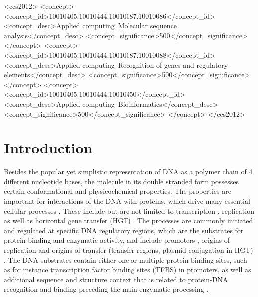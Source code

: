 \documentclass[sigconf]{acmart}
\begin{document}
\begin{CCSXML}
<ccs2012>
<concept>
<concept_id>10010405.10010444.10010087.10010086</concept_id>
<concept_desc>Applied computing~Molecular sequence analysis</concept_desc>
<concept_significance>500</concept_significance>
</concept>
<concept>
<concept_id>10010405.10010444.10010087.10010088</concept_id>
<concept_desc>Applied computing~Recognition of genes and regulatory elements</concept_desc>
<concept_significance>500</concept_significance>
</concept>
<concept>
<concept_id>10010405.10010444.10010450</concept_id>
<concept_desc>Applied computing~Bioinformatics</concept_desc>
<concept_significance>500</concept_significance>
</concept>
</ccs2012>
\end{CCSXML}



\maketitle


\section{Introduction}
Besides the popular yet simplistic representation of DNA as a polymer chain of 4 different nucleotide bases, the molecule in its double stranded form possesses certain conformational and physicochemical properties. The properties are important for interactions of the DNA with proteins, which drive many essential cellular processes \cite{Rohs2009-hm,Zrimec2015-xf,Zrimec2018-lx,Watson2008-dt}. These include but are not limited to transcription \cite{Rohs2009-hm}, replication \cite{Chen2012-gd} as well as horizontal gene transfer (HGT) \cite{Zrimec2018-lx,Zrimec2020-wx}. The processes are commonly initiated and regulated at specific DNA regulatory regions, which are the substrates for protein binding and enzymatic activity, and include promoters \cite{Watson2008-dt}, origins of replication \cite{Chen2012-gd} and origins of transfer (transfer regions, plasmid conjugation in HGT) \cite{Garcillan-Barcia2009-yk}. The DNA substrates contain either one or multiple protein binding sites, such as for instance transcription factor binding sites (TFBS) in promoters, as well as additional sequence and structure context that is related to protein-DNA recognition and binding preceding the main enzymatic processing \cite{Levo2015-iu,Marcovitz2013-kg,Zrimec2018-lx}.
\end{document}
